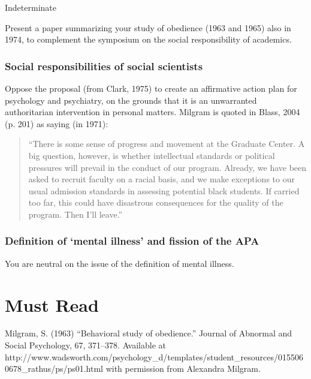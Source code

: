 \begin{refsection}
Indeterminate\begin{writingtask}[Milgram]\label{writingtask:milgram}
Present a paper summarizing your study of obedience (1963 and 1965) also in 1974, to complement the symposium on the social responsibility of academics.
\end{writingtask}

\subsubsection{Social responsibilities of social scientists}
\label{socialresponsibilitiesofsocialscientists}

Oppose the proposal (from Clark, 1975) to create an affirmative action plan for psychology and psychiatry, on the grounds that it is an unwarranted authoritarian intervention in personal matters. Milgram is quoted in Blass, 2004 (p. 201) as saying (in 1971):

\begin{quote}

“There is some sense of progress and movement at the Graduate Center. A big question, however, is whether intellectual standards or political pressures will prevail in the conduct of our program. Already, we have been asked to recruit faculty on a racial basis, and we make exceptions to our usual admission standards in assessing potential black students. If carried too far, this could have disastrous consequences for the quality of the program. Then I'll leave.”
\end{quote}

\subsubsection{Definition of ‘mental illness’ and fission of the APA}
\label{definitionof‘mentalillness’andfissionoftheapa}

You are neutral on the issue of the definition of mental illness.

\section{Must Read}
\label{mustread}

Milgram, S. (1963) “Behavioral study of obedience.” Journal of Abnormal and Social Psychology, 67, 371–378. Available at http:\slash \slash www.wadsworth.com\slash psychology\_d\slash templates\slash student\_resources\slash 0155060678\_rathus\slash ps\slash ps01.html with permission from Alexandra Milgram.


\end{refsection}
